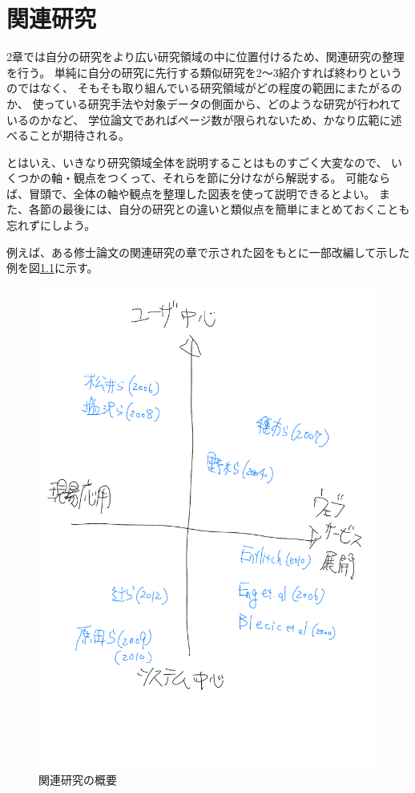 \chapter{関連研究}
\label{chap:relatedwork}

2章では自分の研究をより広い研究領域の中に位置付けるため、関連研究の整理を行う。
単純に自分の研究に先行する類似研究を2～3紹介すれば終わりというのではなく、
そもそも取り組んでいる研究領域がどの程度の範囲にまたがるのか、
使っている研究手法や対象データの側面から、どのような研究が行われているのかなど、
学位論文であればページ数が限られないため、かなり広範に述べることが期待される。

とはいえ、いきなり研究領域全体を説明することはものすごく大変なので、
いくつかの軸・観点をつくって、それらを節に分けながら解説する。
可能ならば、冒頭で、全体の軸や観点を整理した図表を使って説明できるとよい。
また、各節の最後には、自分の研究との違いと類似点を簡単にまとめておくことも忘れずにしよう。

例えば、ある修士論文\cite{obata:2018:master}の関連研究の章で示された図をもとに一部改編して示した例を図\ref{fig:relatedwork-overview}に示す。

\begin{figure}[htb]
    \centering
    \includegraphics[width=.6\hsize]{figures/relatedwork-overview.pdf}
    \caption{関連研究の概要}
    \label{fig:relatedwork-overview}
\end{figure}
